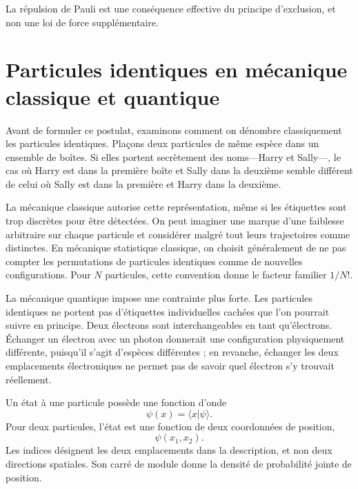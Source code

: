 La répulsion de Pauli est une conséquence effective du principe d’exclusion, et non une loi de force supplémentaire.

\begin{classroomqa}
\end{classroomqa}

\section{Particules identiques en mécanique classique et quantique}

Avant de formuler ce postulat, examinons comment on dénombre classiquement les particules identiques. Plaçons deux particules de même espèce dans un ensemble de boîtes. Si elles portent secrètement des noms---Harry et Sally---, le cas où Harry est dans la première boîte et Sally dans la deuxième semble différent de celui où Sally est dans la première et Harry dans la deuxième.

La mécanique classique autorise cette représentation, même si les étiquettes sont trop discrètes pour être détectées. On peut imaginer une marque d’une faiblesse arbitraire sur chaque particule et considérer malgré tout leurs trajectoires comme distinctes. En mécanique statistique classique, on choisit généralement de ne pas compter les permutations de particules identiques comme de nouvelles configurations. Pour \(N\) particules, cette convention donne le facteur familier \(1/N!\).

La mécanique quantique impose une contrainte plus forte. Les particules identiques ne portent pas d’étiquettes individuelles cachées que l’on pourrait suivre en principe. Deux électrons sont interchangeables en tant qu’électrons. Échanger un électron avec un photon donnerait une configuration physiquement différente, puisqu’il s’agit d’espèces différentes ; en revanche, échanger les deux emplacements électroniques ne permet pas de savoir quel électron s’y trouvait réellement.

Un état à une particule possède une fonction d’onde
\[
\psi(x)=\langle x\vert\psi\rangle.
\]
Pour deux particules, l’état est une fonction de deux coordonnées de position,
\begin{equation}
\psi(x_{1},x_{2}).
\end{equation}
Les indices désignent les deux emplacements dans la description, et non deux directions spatiales. Son carré de module donne la densité de probabilité jointe de position.

